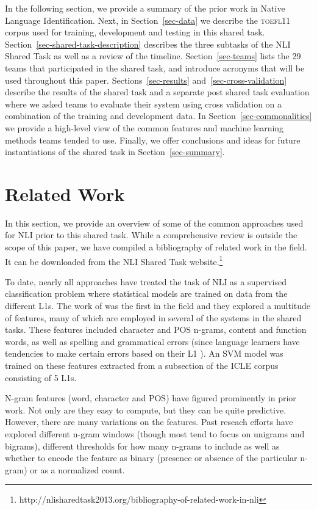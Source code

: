 \documentclass[11pt,letterpaper]{article}
\begin{document}
In the following section, we provide a summary of the prior work in
Native Language Identification.  Next, in Section~\ref{sec-data} we describe
the \textsc{toefl11} corpus used for training, development and testing in
this shared task. Section~\ref{sec-shared-task-description} describes the
three subtasks of the NLI Shared Task as well as a review of the timeline.
Section~\ref{sec-teams} lists the 29 teams that participated
in the shared task, and introduce acronyms that will be used throughout this paper.  Sections~\ref{sec-results}
and~\ref{sec-cross-validation} describe the results of the shared task and a
separate post shared task evaluation where we asked teams to evaluate their
system using cross validation on a combination of the training and development data.  In
Section~\ref{sec-commonalities} we provide a high-level view of the common
features and machine learning methods teams tended to use.  Finally,
we offer conclusions and ideas for future instantiations of the shared task
in Section~\ref{sec-summary}.

\section{Related Work}
\label{sec-relatedwork}
In this section, we provide an overview of some of the common
approaches used for NLI prior to this shared task.  While a
comprehensive review is outside the scope of this paper, we have compiled a
bibliography of related work in the field. It can be downloaded
from the NLI Shared Task website.\footnote{http://nlisharedtask2013.org/bibliography-of-related-work-in-nli}

To date, nearly all approaches have treated the task of NLI as a
supervised classification problem where statistical models are trained on
data from the different L1s.  The work of 
was the first in the field and they explored a multitude of features, many
of which are employed in several of the systems in the shared tasks.  These
features included character and POS n-grams, content and function words,
as well as spelling and grammatical errors (since language learners have
tendencies to make certain errors based on their L1 \cite{SwanSmith01}).
An SVM model was trained on these features extracted from a subsection of
the ICLE corpus consisting of 5 L1s.

N-gram features (word, character and POS)  have figured
prominently in prior work.  Not only are they
easy to compute, but they can be quite predictive.  However, there are
many variations on the features.  Past reseach efforts have explored
different n-gram windows (though most tend to focus on unigrams and bigrams), different thresholds for how many n-grams
to include as well as whether to encode the feature as binary (presence
or absence of the particular n-gram) or as a normalized count.
\end{document}
